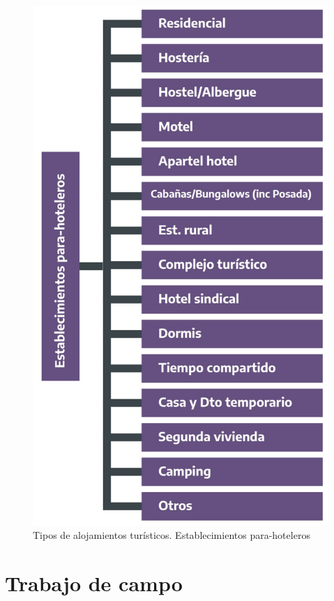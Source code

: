 \documentclass[
]{book}
\begin{document}
\begin{figure}

{\centering \includegraphics[width=1\linewidth]{imagenes/figura_3_2} 

}

\caption{Tipos de alojamientos turísticos. Establecimientos para-hoteleros}\label{fig:establecimientos-para-hoteleros}
\end{figure}

\hypertarget{trabajo-de-campo}{%
\section{Trabajo de campo}\label{trabajo-de-campo}}
\end{document}
